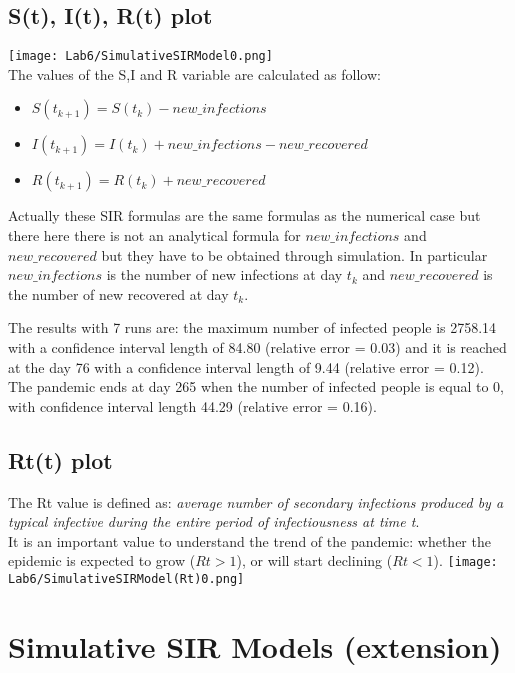 \documentclass[twocolumn,letterpaper]{report}
\begin{document}
{					\subsection{S(t), I(t), R(t) plot}
	 						\texttt{[image: Lab6/SimulativeSIRModel0.png]} \\
								The values of the S,I and R variable are calculated as follow:
								\begin{itemize}
								  \item[] \hspace{0mm} $S(t_{k+1}) = S(t_{k}) - new\_infections$
									\item[] \hspace{0mm} $I(t_{k+1}) = I(t_{k}) + new\_infections - new\_recovered$
									\item[] \hspace{0mm} $R(t_{k+1}) = R(t_{k}) + new\_recovered$
			 					\end{itemize}
			 Actually these SIR formulas are the same formulas as the numerical case but there here there is not an analytical formula for $new\_infections$ and $new\_recovered$ but they have to be obtained through simulation.
			 In particular $new\_infections$ is the number of new infections at day $t_k$ and $new\_recovered$ is the number of new recovered at day  $t_k$.
			  								
			The results with 7 runs are: the maximum number of infected people is 2758.14 with a confidence interval length of 84.80 (relative error = 0.03) and it is reached at the day 76 with a confidence interval length of 9.44 (relative error = 0.12). The pandemic ends at day 265 when the number of infected people is equal to 0, with confidence interval length 44.29 (relative error = 0.16).
			
			\subsection{Rt(t) plot}
			The Rt value is defined as: \emph{average number of secondary infections produced by a typical infective during the entire period of infectiousness at time t}. \\
			 It is an important value to understand the trend of the pandemic: whether the epidemic is expected to grow ($Rt > 1$), or will start declining ($Rt < 1$).
			\texttt{[image: Lab6/SimulativeSIRModel(Rt)0.png]} \\
			

			\section{Simulative SIR Models (extension)}
			
}
\end{document}
